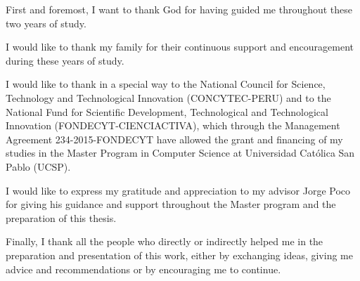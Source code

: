\begin{agradecimientos}

First and foremost, I want to thank God for having guided me throughout these two years of study.

I would like to thank my family for their continuous support and encouragement during these years of study.

I would like to thank in a special way to the National Council for Science, Technology and Technological Innovation (CONCYTEC-PERU) and to the National Fund for Scientific Development, Technological and Technological Innovation (FONDECYT-CIENCIACTIVA), which through the Management Agreement 234-2015-FONDECYT have allowed the grant and financing of my studies in the Master Program in Computer Science at Universidad Cat\'{o}lica San Pablo (UCSP).

I would like to express my gratitude and appreciation to my advisor Jorge Poco for giving his guidance and support throughout the Master program and the preparation of this thesis.


Finally, I thank all the people who directly or indirectly helped me in the preparation and presentation of this work, either by exchanging ideas, giving me advice and recommendations or by encouraging me to continue.


\end{agradecimientos}
